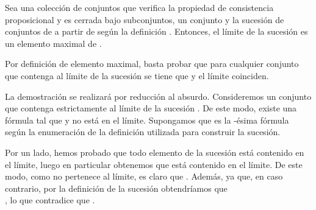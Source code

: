 \begin{isabellebody}
\begin{isamarkuptext}
  \begin{lema}
    Sea  una colección de conjuntos que verifica la propiedad de consistencia proposicional y
    es cerrada bajo subconjuntos,  un conjunto y  la sucesión de conjuntos de  a partir 
    de  según la definición . Entonces, el límite de la sucesión  es un elemento 
    maximal de .
  \end{lema}

  \begin{demostracion}
    Por definición de elemento maximal, basta probar que para cualquier conjunto  que
    contenga al límite de la sucesión se tiene que  y el límite coinciden.

    La demostración se realizará por reducción al absurdo. Consideremos un conjunto  que 
    contenga estrictamente al límite de la sucesión . De este modo, existe una fórmula  tal 
    que  y  no está en el límite. Supongamos que  es la -ésima fórmula según la 
    enumeración de la definición  utilizada para construir la sucesión. 

    Por un lado, hemos probado que todo elemento de la sucesión está contenido en el límite, luego 
    en particular obtenemos que  está contenido en el límite. De este modo, como  no 
    pertenece al límite, es claro que . Además,  ya que, en caso contrario, 
    por la definición  de la sucesión obtendríamos que\\ , lo que contradice 
    que . 


\end{demostracion}
\end{isamarkuptext}
\end{isabellebody}
